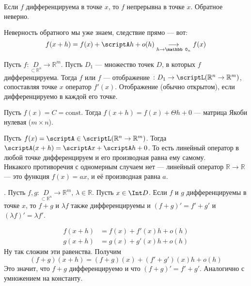 \documentclass{article}
\begin{document}
\begin{itemize}
\begin{Comment}
        \end{Comment}
        \thm Если $f$ дифференцируема в точке $x$, то $f$ непрерывна в точке $x$. Обратное неверно.
        \begin{Proof}
            Неверность обратного мы уже знаем, следствие прямо --- вот:
            $$
            f(x+h)=f(x)+\scriptA h+o(h)\underset{h\to\mathbb0_n}\longrightarrow f(x)
            $$
        \end{Proof}
        \dfn Пусть $f\colon\underset{\subset\mathbb R^n}D\to\mathbb R^m$. Пусть $D_1$ --- множество точек $D$, в которых $f$ дифференцируема. Тогда  $f$ или  $f$ --- отображение $\colon D_1\to\scriptL(\mathbb R^n\to\mathbb R^m)$, сопоставляя точке $x$ оператор $f'(x)$.
        \dfn Отображение  (обычно открытом), если дифференцируемо в каждой его точке.
        \begin{Example}
            Пусть $f(x)=C=\mathrm{const}$. Тогда $f(x+h)=f(x)+\Theta h+0$ --- матрица Якоби нулевая ($m\times n$).
        \end{Example}
        \begin{Example}
            Пусть $f(x)=\scriptA\in\scriptL(\mathbb R^n\to\mathbb R^m)$. Тогда $\scriptA(x+h)=\scriptA x+\scriptA h+0$. То есть линейный оператор в любой точке дифференцируем и его производная равна ему самому.\\
            Никакого противоречия с одномерным случаем нет --- линейный оператор $\mathbb R\to\mathbb R$ --- это функция $f(x)=ax$, и её производная равна $a$.
        \end{Example}
        \thm {}. Пусть $f,g\colon\underset{\subset\mathbb R^n}D\to\mathbb R^m$, $\lambda\in\mathbb R$. Пусть $x\in\Int D$. Если $f$ и $g$ дифференцируемы в точке $x$, то $f+g$ и $\lambda f$ также дифференцируемы и $(f+g)'=f'+g'$ и $(\lambda f)'=\lambda f'$.
        \begin{Proof}
            \[\begin{aligned}
                f(x+h)&=f(x)+f'(x)h+o(h)\\
                g(x+h)&=g(x)+g'(x)h+o(h)
            \end{aligned}\]
            Ну так сложим эти равенства. Получим
            $$
            (f+g)(x+h)=(f+g)(x)+(f'+g')(x)h+o(h)
            $$
            Это значит, что $f+g$ дифференцируемо и что $(f+g)'=f'+g'$. Аналогично с умножением на константу.

\end{Proof}
\end{itemize}
\end{document}
